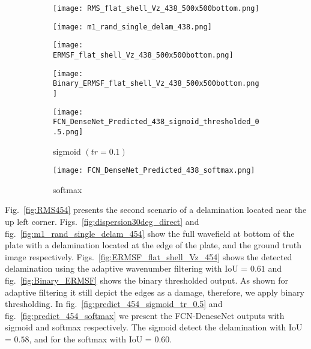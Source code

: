 	\begin{figure} [h!]
		\centering
		\begin{subfigure}[b]{0.47\textwidth}
			\centering
			\texttt{[image: RMS\_flat\_shell\_Vz\_438\_500x500bottom.png]}
			\caption{}
			\label{fig:dispersion15deg_direct}
		\end{subfigure}
		\hfill
			\begin{subfigure}[b]{0.47\textwidth}
			\centering
			\texttt{[image: m1\_rand\_single\_delam\_438.png]}
			\caption{}
			\label{fig:m1_rand_single_delam_438}
		\end{subfigure}
		\hfill
		\begin{subfigure}[b]{0.47\textwidth}
			\centering
			\texttt{[image: ERMSF\_flat\_shell\_Vz\_438\_500x500bottom.png]}
			\caption{}
			\label{fig:ERMSF_flat_shell_Vz_438}
		\end{subfigure}
		\hfill
		\begin{subfigure}[b]{0.47\textwidth}
			\centering
			\texttt{[image: Binary\_ERMSF\_flat\_shell\_Vz\_438\_500x500bottom.png]}
			\caption{}
			\label{fig:Binary_ERMSF_flat_shell_Vz_438}
		\end{subfigure}
		\hfill
		\begin{subfigure}[b]{0.47\textwidth}
			\centering
		\texttt{[image: FCN\_DenseNet\_Predicted\_438\_sigmoid\_thresholded\_0.5.png]}
		\caption{sigmoid \((tr = 0.1)\)}
		\label{fig:predict_438_sigmoid_tr_0.5}
		\end{subfigure}
		\hfill
		\begin{subfigure}[b]{0.47\textwidth}
			\centering
			\texttt{[image: FCN\_DenseNet\_Predicted\_438\_softmax.png]}
			\caption{softmax}
			\label{fig:predict_438_softmax}
		\end{subfigure}

		\caption{}
		\label{fig:RMS438}
	\end{figure} 
	Fig.~\ref{fig:RMS454} presents the second scenario of a delamination located near the up left corner.
	Figs.~\ref{fig:dispersion30deg_direct} and fig.~\ref{fig:m1_rand_single_delam_454} show the full wavefield at bottom  of the plate with a delamination located at the edge of the plate, and the ground truth image respectively.
	Figs.~\ref{fig:ERMSF_flat_shell_Vz_454} shows the detected delamination using the adaptive wavenumber filtering with IoU = \(0.61\) and fig.~\ref{fig:Binary_ERMSF} shows the binary thresholded output.
	As shown for adaptive filtering it still depict the edges as a damage, therefore, we apply binary thresholding.
	In fig.~\ref{fig:predict_454_sigmoid_tr_0.5} and fig.~\ref{fig:predict_454_softmax} we present the FCN-DeneseNet outputs with sigmoid and softmax respectively.
	The sigmoid detect the delamination with IoU = \(0.58\), and for the softmax with IoU = \(0.60\).
	
